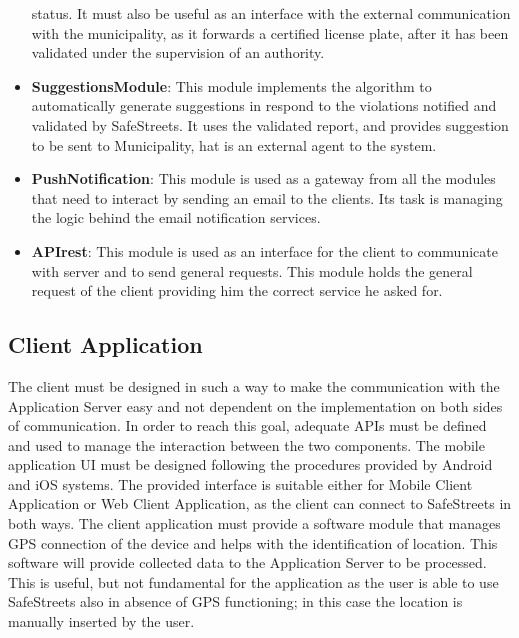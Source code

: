 \begin{itemize}
  status. It must also be useful as an interface with the external communication with the municipality, as it forwards a 
  certified license plate, after it has been validated under the supervision of an authority.
  \item \textbf{SuggestionsModule}: This module implements the algorithm to automatically generate suggestions in respond to the
  violations notified and validated by SafeStreets. It uses the validated report, and provides suggestion to be sent to Municipality,
  hat is an external agent to the system.
  \item \textbf{PushNotification}: This module is used as a gateway from all the modules that need to interact by 
  sending an email to the clients. Its task is managing the logic behind the email notification services.
  \item \textbf{APIrest}: This module is used as an interface for the client to communicate with server and to send
  general requests. This module holds the general request of the client providing him the correct service he asked for.
\end{itemize}

\subsection{Client Application}
The client must be designed in such a way to make the communication with the Application Server easy and not dependent 
on the implementation on both sides of communication. In order to reach this goal, adequate APIs must be defined and used 
to manage the interaction between the two components. The mobile application UI must be designed following the procedures 
provided by Android and iOS systems. The provided interface is suitable either for Mobile Client Application or Web Client Application,
as the client can connect to SafeStreets in both ways.
\newline The client application must provide a software module that manages GPS connection of the device and helps with 
the identification of location. This software will provide collected data to the Application Server to be processed. This 
is useful, but not fundamental for the application as the user is able to use SafeStreets also in absence of GPS 
functioning; in this case the location is manually inserted by the user.

